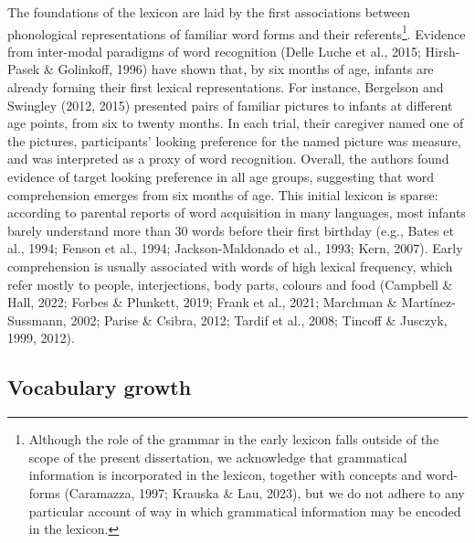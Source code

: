 \documentclass[
  12pt,
  b5paperpaper,
  twoside]{scrreprt}
\begin{document}
The foundations of the lexicon are laid by the first associations
between phonological representations of familiar word forms and their
referents\footnote{Although the role of the grammar in the early lexicon
  falls outside of the scope of the present dissertation, we acknowledge
  that grammatical information is incorporated in the lexicon, together
  with concepts and word-forms (Caramazza, 1997; Krauska \& Lau, 2023),
  but we do not adhere to any particular account of way in which
  grammatical information may be encoded in the lexicon.}. Evidence from
inter-modal paradigms of word recognition (Delle Luche et al., 2015;
Hirsh-Pasek \& Golinkoff, 1996) have shown that, by six months of age,
infants are already forming their first lexical representations. For
instance, Bergelson and Swingley (2012, 2015) presented pairs of
familiar pictures to infants at different age points, from six to twenty
months. In each trial, their caregiver named one of the pictures,
participants' looking preference for the named picture was measure, and
was interpreted as a proxy of word recognition. Overall, the authors
found evidence of target looking preference in all age groups,
suggesting that word comprehension emerges from six months of age. This
initial lexicon is sparse: according to parental reports of word
acquisition in many languages, most infants barely understand more than
30 words before their first birthday (e.g., Bates et al., 1994; Fenson
et al., 1994; Jackson-Maldonado et al., 1993; Kern, 2007). Early
comprehension is usually associated with words of high lexical
frequency, which refer mostly to people, interjections, body parts,
colours and food (Campbell \& Hall, 2022; Forbes \& Plunkett, 2019;
Frank et al., 2021; Marchman \& Martínez-Sussmann, 2002; Parise \&
Csibra, 2012; Tardif et al., 2008; Tincoff \& Jusczyk, 1999, 2012).

\hypertarget{vocabulary-growth}{%
\subsection{Vocabulary growth}\label{vocabulary-growth}}
\end{document}
